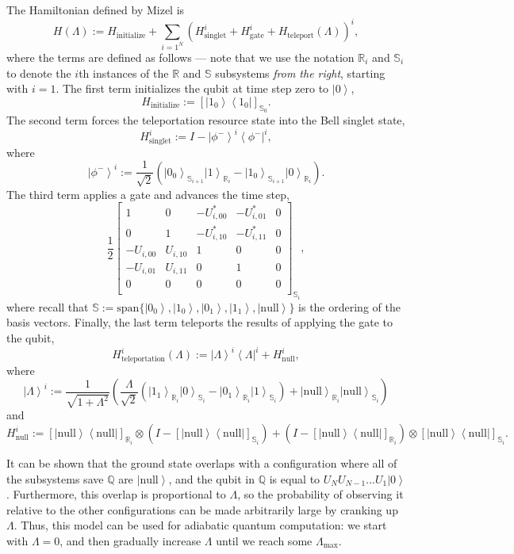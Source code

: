 \documentclass[12pt]{amsbook}
\theoremstyle{plain}
\theoremstyle{definition}
\theoremstyle{remark}
\newcommand{\ket}[1]{\left|#1\right>}
\newcommand{\bra}[1]{\left<#1\right|}
\newcommand{\ketbra}[2]{\ket{#1}\!\!\bra{#2}}
\newcommand{\paren}[1]{\left(#1\right)}
\begin{document}
The Hamiltonian defined by Mizel is $$H(\Lambda) := H_{\text{initialize}} + \sum_{i=1^N}\paren{H_{\text{singlet}}^i + H_{\text{gate}}^i + H_\text{teleport}(\Lambda)}^i,$$ where the terms are defined as follows --- note that we use the notation $\mathbb{R}_i$ and $\mathbb{S}_i$ to denote the $i$th instances of the $\mathbb{R}$ and $\mathbb{S}$ subsystems \emph{from the right}, starting with $i=1$. 
The first term initializes the qubit at time step zero to $\ket{0}$,
$$H_{\text{initialize}} := [\ketbra{1_0}{1_0}]_{\mathbb{S}_0}.$$
The second term forces the teleportation resource state into the Bell singlet state,
$$H_{\text{singlet}}^i := I - \ket{\phi^{-}}^i\bra{\phi^{-}}^i,$$
where
$$\ket{\phi^{-}}^i := \frac{1}{\sqrt{2}}\paren{\ket{0_0}_{\mathbb{S}_{i+1}}\ket{1}_{\mathbb{R}_i}-\ket{1_0}_{\mathbb{S}_{i+1}}\ket{0}_{\mathbb{R}_i}}.$$
The third term applies a gate and advances the time step,
$$\frac{1}{2}\begin{bmatrix}
1 & 0 & -U_{i,00}^* & -U_{i,01}^* & 0\\
0 & 1 & -U_{i,10}^* & -U_{i,11}^* & 0\\
-U_{i,00} & U_{i,10} & 1 & 0 & 0\\
-U_{i,01} & U_{i,11} & 0 & 1 & 0\\
0 & 0 & 0 & 0 & 0\\
\end{bmatrix}_{\mathbb{S}_i},$$
where recall that $\mathbb{S}:=\text{span}\{\ket{0_0},\ket{1_0},\ket{0_1},\ket{1_1},\ket{\text{null}}\}$ is the ordering of the basis vectors.  Finally, the last term teleports the results of applying the gate to the qubit,
$$H_{\text{teleportation}}^i(\Lambda) := \ket{\Lambda}^i\bra{\Lambda}^i + H_{\text{null}}^i,$$
where
$$\ket{\Lambda}^i := \frac{1}{\sqrt{1+\Lambda^2}}\paren{\frac{\Lambda}{\sqrt{2}}(\ket{1_1}_{\mathbb{R}_i}\ket{0}_{\mathbb{S}_i}-\ket{0_1}_{\mathbb{R}_i}\ket{1}_{\mathbb{S}_i})+\ket{\text{null}}_{\mathbb{R}_i}\ket{\text{null}}_{\mathbb{S}_i}}$$
and
$$H_{\text{null}}^i := [\ketbra{\text{null}}{\text{null}}]_{\mathbb{R}_i}\otimes\paren{I-[\ketbra{\text{null}}{\text{null}}]_{\mathbb{S}_i}}+\paren{I-[\ketbra{\text{null}}{\text{null}}]_{\mathbb{R}_i}}\otimes[\ketbra{\text{null}}{\text{null}}]_{\mathbb{S}_i}.$$

It can be shown that the ground state overlaps with a configuration where all of the subsystems save $\mathbb{Q}$ are $\ket{\text{null}}$, and the qubit in $\mathbb{Q}$ is equal to $U_N U_{N-1}\dots U_1\ket{0}$.  Furthermore, this overlap is proportional to $\Lambda$, so the probability of observing it relative to the other configurations can be made arbitrarily large by cranking up $\Lambda$.  Thus, this model can be used for adiabatic quantum computation:  we start with $\Lambda=0$, and then gradually increase $\Lambda$ until we reach some $\Lambda_{\text{max}}$.
\end{document}
